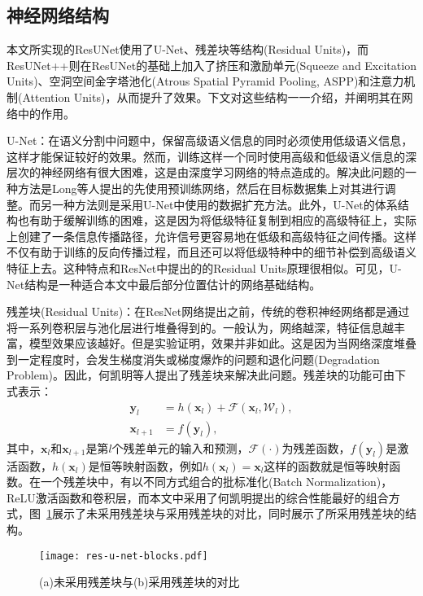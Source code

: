 \subsection{神经网络结构}

本文所实现的ResUNet使用了U-Net、残差块等结构(Residual Units)，而ResUNet++则在ResUNet的基础上加入了挤压和激励单元(Squeeze and Excitation Units)、空洞空间金字塔池化(Atrous Spatial Pyramid Pooling, ASPP)和注意力机制(Attention Units)，从而提升了效果。下文对这些结构一一介绍，并阐明其在网络中的作用。

U-Net：在语义分割中问题中，保留高级语义信息的同时必须使用低级语义信息，这样才能保证较好的效果。然而，训练这样一个同时使用高级和低级语义信息的深层次的神经网络有很大困难，这是由深度学习网络的特点造成的。解决此问题的一种方法是Long等人\cite{2015Fully}提出的先使用预训练网络，然后在目标数据集上对其进行调整。而另一种方法则是采用U-Net\cite{2015U}中使用的数据扩充方法。此外，U-Net的体系结构也有助于缓解训练的困难，这是因为将低级特征复制到相应的高级特征上，实际上创建了一条信息传播路径，允许信号更容易地在低级和高级特征之间传播。这样不仅有助于训练的反向传播过程，而且还可以将低级特种中的细节补偿到高级语义特征上去。这种特点和ResNet\cite{he2016deep}中提出的的Residual Units原理很相似。可见，U-Net结构是一种适合本文中最后部分位置估计的网络基础结构。

残差块(Residual Units)：在ResNet网络提出之前，传统的卷积神经网络都是通过将一系列卷积层与池化层进行堆叠得到的。一般认为，网络越深，特征信息越丰富，模型效果应该越好。但是实验证明，效果并非如此。这是因为当网络深度堆叠到一定程度时，会发生梯度消失或梯度爆炸的问题和退化问题(Degradation Problem)\cite{he2016deep}。因此，何凯明等人提出了残差块来解决此问题。残差块的功能可由下式表示：
\begin{equation}
    \begin{split}
    \mathbf{y}_{l}\ \ \ & = h(\mathbf{x}_{l})+\mathcal{F}(\mathbf{x}_{l}, \mathcal{W}_{l}), \\
    \mathbf{x}_{l+1} & = f(\mathbf{y}_{l}),
    \end{split}
\end{equation}
其中，$\mathbf{x}_{l}$和$\mathbf{x}_{l+1}$是第$l$个残差单元的输入和预测，$\mathcal{F}(\cdot)$为残差函数，$f(\mathbf{y}_l)$是激活函数，$h(\mathbf{x}_{l})$是恒等映射函数，例如$h(\mathbf{x}_{l}) = \mathbf{x}_{l}$这样的函数就是恒等映射函数。在一个残差块中，有以不同方式组合的批标准化(Batch Normalization)，ReLU激活函数和卷积层，而本文中采用了何凯明\cite{he2016deep}提出的综合性能最好的组合方式，图~\ref{residual_compare}展示了未采用残差块与采用残差块的对比，同时展示了所采用残差块的结构。
\begin{figure}
    \centering
    \texttt{[image: res-u-net-blocks.pdf]}
    \caption{(a)未采用残差块与(b)采用残差块的对比}
    \label{residual_compare}
\end{figure}

